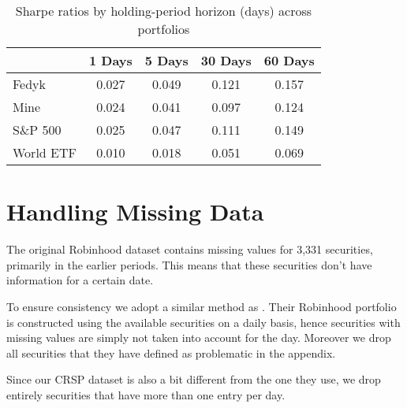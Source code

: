 \begin{appendices}
\begin{table}[ht]
\centering
\caption{Sharpe ratios by holding-period horizon (days) across portfolios}
\label{tab:sharpe_ratio}
\begin{tabular}{l|c c c c}
    \toprule
    \multicolumn{1}{r}{} & \multicolumn{1}{r}{\textbf{1 Days}} & \multicolumn{1}{r}{\textbf{5 Days}} & \multicolumn{1}{r}{\textbf{30 Days}} & \multicolumn{1}{r}{\textbf{60 Days}} \\
    \midrule
    Fedyk                & 0.027                               & 0.049                               & 0.121                                & 0.157                                \\
    Mine                 & 0.024                               & 0.041                               & 0.097                                & 0.124                                \\
    S\&P 500             & 0.025                               & 0.047                               & 0.111                                & 0.149                                \\
    World ETF            & 0.010                               & 0.018                               & 0.051                                & 0.069                               
\end{tabular}
\end{table}




\clearpage
\section{Handling Missing Data}
\label{sec:data}
The original Robinhood dataset contains missing values for 3,331 securities, primarily in the earlier periods. 
This means that these securities don't have information for a certain date.
   
To ensure consistency we adopt a similar method as \cite{Fedyk2024}. Their Robinhood portfolio is constructed using the available securities on a daily basis, 
hence securities with missing values are simply not taken into account for the day. Moreover we drop all securities that they have defined as problematic in the appendix.

Since our CRSP dataset is also a bit different from the one they use, we drop entirely securities that have more than one entry per day.


\end{appendices}
